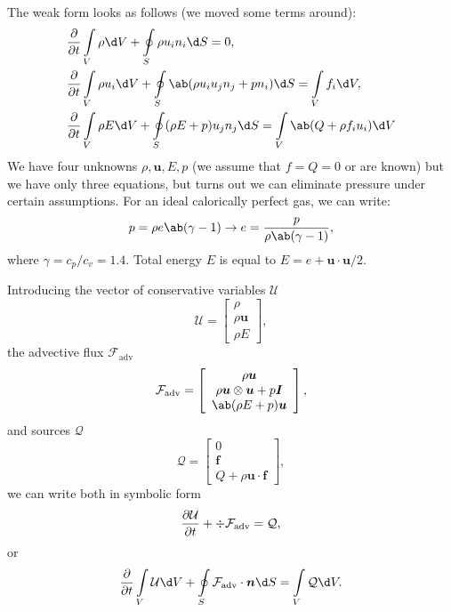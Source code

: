 \documentclass[justified, nobib]{tufte-handout}
\begin{document}
The weak form looks as follows (we moved some terms around):
\begin{equation}
	\begin{split}
		 & \pdv{}{t}\int\limits_V \rho \d V
		+ \oint\limits_S\rho u_i n_i \d S = 0,  \\
		 & \pdv{}{t}\int\limits_V \rho u_i \d V
		+ \oint\limits_S \ab( \rho u_i u_j n_j + p n_i) \d S
		= \int\limits_V f_i \d V,               \\
		 & \pdv{}{t}\int\limits_V \rho E \d V
		+ \oint\limits_S (\rho E + p)  u_j n_j \d S
		= \int\limits_V \ab( Q + \rho f_i u_i) \d V
	\end{split}
	\label{eq:euler-integral}
\end{equation}
We have four unknowns \(\rho, \bm{u}, E, p\) (we assume that \(f = Q = 0\) or
are known) but we have only three equations, but turns out we can eliminate pressure under
certain assumptions.
For an ideal calorically perfect
gas, we can write:
\begin{equation}
	p = \rho e \ab(\gamma - 1)
	\rightarrow
	e = \frac{p}{\rho \ab(\gamma - 1)},
\end{equation}
where \(\gamma = c_p / c_v = 1.4\). Total energy \(E\) is equal to
\(E = e + \bm{u}\cdot\bm{u}/2\).

Introducing the vector of conservative variables
\(\mathcal{U}\)
\begin{equation}
	\mathcal{U} = \left[
		\begin{array}{c}
			\rho        \\
			\rho \bm{u} \\
			\rho E
		\end{array} \right],
\end{equation}
the advective flux \(\mathcal{F}_\mathrm{adv}\)
\[
	\mathcal{F}_\mathrm{adv} = \left[
		\begin{array}{c}
			\rho \bm{u}                         \\
			\rho \bm{u}\otimes\bm{u} + p \bm{I} \\
			\ab(\rho E  + p) \bm{u}
		\end{array} \right],
\]
and sources \(\mathcal{Q}\)
\[
	\mathcal{Q} = \left[
		\begin{array}{c}
			0      \\
			\bm{f} \\
			Q + \rho \bm{u}\cdot\bm{f}
		\end{array} \right],
\]
we can write both in symbolic form
\[
	\pdv{\mathcal{U}}{t} + \div\mathcal{F}_\mathrm{adv} = \mathcal{Q},
\]
or
\[
	\pdv{}{t} \int\limits_V \mathcal{U} \d V
	+ \oint\limits_S \mathcal{F}_\mathrm{adv}\cdot \bm{n} \d S
	= \int\limits_V \mathcal{Q} \d V.
\]
\end{document}
